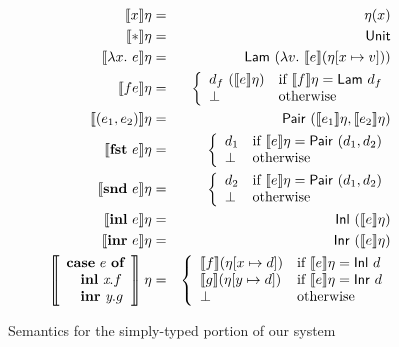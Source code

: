 \begin{figure}[t]
  \centering
\begin{eqnarray*}
  \sem{x}\eta & = & \eta(x) \\
  \sem{*}\eta & = & \semCons{Unit} \\
  \sem{\lambda x.\ e}\eta & = & \semCons{Lam}\ (\lambda v.\ \sem{e}(\eta[x \mapsto v])) \\
  \sem{fe}\eta & = & \left\{
    \begin{array}{ll}
      d_f\ (\sem{e}\eta) & \textrm{if}\ \sem{f}\eta = \semCons{Lam}\ d_f \\
      \bot & \textrm{otherwise}
    \end{array}
    \right. \\
  \sem{(e_1,e_2)}\eta & = & \semCons{Pair}\ (\sem{e_1}\eta, \sem{e_2}\eta) \\
  \sem{\kw{fst}\ e}\eta & = & \left\{
    \begin{array}{ll}
      d_1 & \textrm{if}\ \sem{e}\eta = \semCons{Pair}\ (d_1, d_2) \\
      \bot & \textrm{otherwise}
    \end{array}
  \right. \\
  \sem{\kw{snd}\ e}\eta & = & \left\{
    \begin{array}{ll}
      d_2 & \textrm{if}\ \sem{e}\eta = \semCons{Pair}\ (d_1, d_2) \\
      \bot & \textrm{otherwise}
    \end{array}
  \right. \\
  \sem{\kw{inl}\ e}\eta & = & \semCons{Inl}\ (\sem{e}\eta) \\
  \sem{\kw{inr}\ e}\eta & = & \semCons{Inr}\ (\sem{e}\eta) \\
  \left\llbracket
    \begin{array}{l}
      \kw{case}\ e\ \kw{of}\\
      \quad\kw{inl}\ \ident{x}.f\\
      \quad\kw{inr}\ \ident{y}.g
    \end{array}
  \right\rrbracket\eta & = &
  \left\{
    \begin{array}{ll}
      \sem{f}(\eta[x \mapsto d]) & \textrm{if }\sem{e}\eta = \semCons{Inl}\ d \\
      \sem{g}(\eta[y \mapsto d]) & \textrm{if }\sem{e}\eta = \semCons{Inr}\ d \\
      \bot & \textrm{otherwise}
    \end{array}
  \right. \\
\end{eqnarray*}  
  \caption{Semantics for the simply-typed portion of our system}
  \label{fig:semantics1}
\end{figure}

